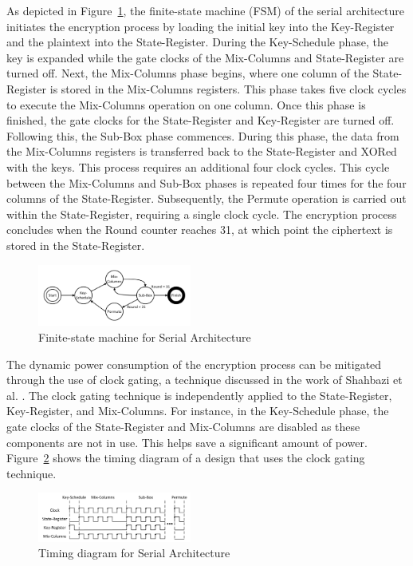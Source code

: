 \documentclass[final,5p,times,twocolumn]{elsarticle}
\begin{document}
As depicted in Figure~\ref{serial_fsm_fig}, the finite-state machine (FSM) of the serial architecture initiates the encryption process by loading the initial key into the Key-Register and the plaintext into the State-Register.
During the Key-Schedule phase, the key is expanded while the gate clocks of the Mix-Columns and State-Register are turned off.
Next, the Mix-Columns phase begins, where one column of the State-Register is stored in the Mix-Columns registers. This phase takes five clock cycles to execute the Mix-Columns operation on one column.
Once this phase is finished, the gate clocks for the State-Register and Key-Register are turned off.
Following this, the Sub-Box phase commences. During this phase, the data from the Mix-Columns registers is transferred back to the State-Register and XORed with the keys. This process requires an additional four clock cycles.
This cycle between the Mix-Columns and Sub-Box phases is repeated four times for the four columns of the State-Register.
Subsequently, the Permute operation is carried out within the State-Register, requiring a single clock cycle.
The encryption process concludes when the Round counter reaches 31, at which point the ciphertext is stored in the State-Register.

\begin{figure}[h]%
    \centering
    \includegraphics[width=0.45\textwidth]{./fig/serial-fsm.pdf}
    \caption{Finite-state machine for Serial Architecture}\label{serial_fsm_fig}
\end{figure}

The dynamic power consumption of the encryption process can be mitigated through the use of clock gating, a technique discussed in the work of Shahbazi et al. \cite{Shahbazi2021}.
The clock gating technique is independently applied to the State-Register, Key-Register, and Mix-Columns.
For instance, in the Key-Schedule phase, the gate clocks of the State-Register and Mix-Columns are disabled as these components are not in use.
This helps save a significant amount of power. Figure~\ref{serial_time_diagrm} shows the timing diagram of a design that uses the clock gating technique.

\begin{figure}[h]%
    \centering
    \includegraphics[width=0.45\textwidth]{./fig/serial-time.pdf}
    \caption{Timing diagram for Serial Architecture}\label{serial_time_diagrm}
\end{figure}
\end{document}
